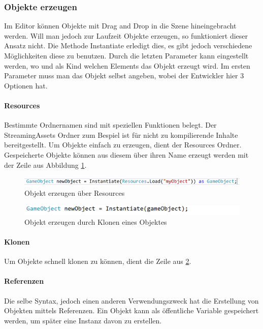 \subsubsection{Objekte erzeugen}
Im Editor können Objekte mit Drag and Drop in die Szene hineingebracht werden. Will man jedoch zur Laufzeit Objekte erzeugen, so funktioniert dieser Ansatz nicht. Die Methode Instantiate erledigt dies, es gibt jedoch verschiedene Möglichkeiten diese zu benutzen.  Durch die letzten Parameter kann eingestellt werden, wo und als Kind welchen Elements das Objekt erzeugt wird. Im ersten Parameter muss man das Objekt selbst angeben, wobei der Entwickler hier 3 Optionen hat.
\paragraph{Resources}
Bestimmte Ordnernamen sind mit speziellen Funktionen belegt. Der StreamingAssets Ordner zum Bespiel ist für nicht zu kompilierende Inhalte bereitgestellt. Um Objekte einfach zu erzeugen, dient der Resources Ordner. Gespeicherte Objekte können aus diesem über ihren Name erzeugt werden mit der Zeile aus Abbildung \ref{img:unity-instantiate01}.
\begin{figure}
    \includegraphics[scale=0.8]{images/unityInstantiate01.png}
    \caption{Objekt erzeugen über Resources}
    \label{img:unity-instantiate01}
\end{figure}
\begin{figure}
    \includegraphics[scale=0.8]{images/unityInstantiate02.png}
    \caption{Objekt erzeugen durch Klonen eines Objektes}
    \label{img:unity-instantiate02}
\end{figure}
\paragraph{Klonen}
Um Objekte schnell klonen zu können, dient die Zeile aus \ref{img:unity-instantiate02}.

\paragraph{Referenzen}
Die selbe Syntax, jedoch einen anderen Verwendungszweck hat die Erstellung von Objekten mittels Referenzen. Ein Objekt kann als öffentliche Variable gespeichert werden, um später eine Instanz davon zu erstellen.
